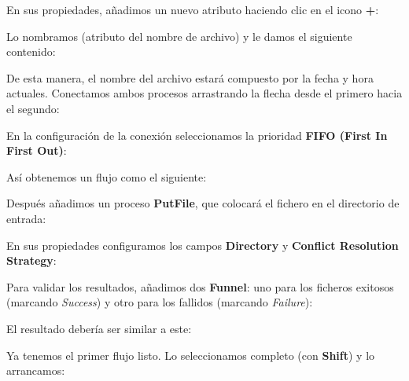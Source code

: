 \documentclass{../../miPlantilla}
\begin{document}

\newpage

En sus propiedades, añadimos un nuevo atributo haciendo clic en el icono \textbf{+}:


Lo nombramos  (atributo del nombre de archivo) y le damos el siguiente contenido:


De esta manera, el nombre del archivo estará compuesto por la fecha y hora actuales.  
Conectamos ambos procesos arrastrando la flecha desde el primero hacia el segundo:


En la configuración de la conexión seleccionamos la prioridad \textbf{FIFO (First In First Out)}:


Así obtenemos un flujo como el siguiente:


Después añadimos un proceso \textbf{PutFile}, que colocará el fichero en el directorio de entrada:


\newpage

En sus propiedades configuramos los campos \textbf{Directory} y \textbf{Conflict Resolution Strategy}:


Para validar los resultados, añadimos dos \textbf{Funnel}: uno para los ficheros exitosos (marcando \textit{Success}) y otro para los fallidos (marcando \textit{Failure}):

\begin{figure}[H]
    \centering
    \begin{minipage}{0.1\textwidth}  %
    \end{minipage}\hfill
    \begin{minipage}{0.8\textwidth}   %
    \end{minipage}
\end{figure}

\newpage

El resultado debería ser similar a este:


Ya tenemos el primer flujo listo. Lo seleccionamos completo (con \textbf{Shift}) y lo arrancamos:
\end{document}
